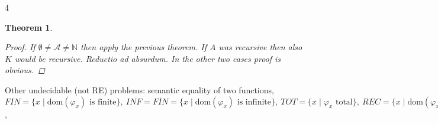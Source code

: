 \documentclass[10pt,landscape]{article}
\newcommand{\N}{\mathbb{N}}
\theoremstyle{plain}%
\newtheorem*{thm}{Theorem}
\theoremstyle{definition}
\theoremstyle{remark}
\begin{document}
\begin{multicols}{4}
\begin{thm}
    \begin{proof}
        If $\emptyset \neq \mathcal{A} \neq \N$ then apply the previous theorem. If $A$ was recursive then also $K$ would be recursive.
        \textit{Reductio ad absurdum}. In the other two cases proof is obvious.
    \end{proof}
\end{thm}

Other undecidable (not RE) problems: semantic equality of two functions,
$FIN = \{x \mid \text{dom}(\varphi_x) \text{ is finite}\},\ INF = \overline{FIN} = \{x \mid 
\text{dom}(\varphi_x) \text{ is infinite}\},\ TOT = \{x \mid \varphi_x \text{ total}\}, \ 
REC = \{x \mid \text{dom}(\varphi_x) \text{ is recursive}\},\  
CONST = \{x \mid \varphi_x \text{ is total and constant}\}, \ 
EXT = \{x \mid \varphi_x \text{ can be extended to total computable}\}$,  



\end{multicols}
\end{document}
